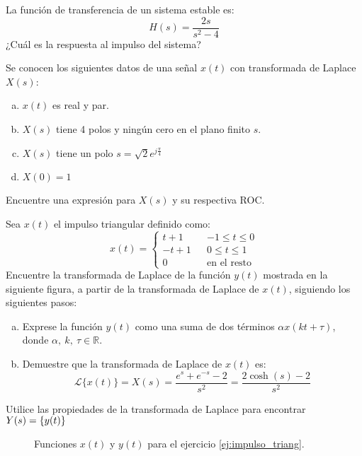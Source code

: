 \begin{ejercicio}
	La función de transferencia de un sistema estable es:
	$$ H(s) = \frac{2s}{s^2-4} $$
	¿Cuál es la respuesta al impulso del sistema?
\end{ejercicio}

\begin{ejercicio}
	Se conocen los siguientes datos de una señal $x(t)$ con transformada de Laplace $X(s)$:
	\begin{enumerate}[a.]
		\item $x(t)$ es real y par.
		\item $X(s)$ tiene 4 polos y ningún cero en el plano finito $s$.
		\item $X(s)$ tiene un polo $s=\sqrt{2}e^{j\frac{\pi}{4}}$
		\item $X(0) = 1$
	\end{enumerate}
	Encuentre una expresión para $X(s)$ y su respectiva ROC.
\end{ejercicio}

\begin{ejercicio}
	\label{ej:impulso_triang}
	Sea $x(t)$ el impulso triangular definido como:
	\begin{equation*}
		x(t) = \left \{
		\begin{matrix}
			t+1 && -1 \leq t \leq 0\\
			-t+1 && 0 \leq t \leq 1\\
			0 && \text{en el resto} 			
		\end{matrix}
		\right .
	\end{equation*}
	Encuentre la transformada de Laplace de la función $y(t)$ mostrada en la siguiente figura, a partir de la transformada de Laplace de $x(t)$, siguiendo los siguientes pasos:


	\begin{enumerate}[a.]
		\item Exprese la función $y(t)$ como una suma de dos términos $\alpha x(kt+\tau)$, donde $\alpha,~k,~\tau \in \mathbb{R}$.
		\item Demuestre que la transformada de Laplace de $x(t)$ es:
			$$ \mathscr{L}\{x(t)\} = X(s) = \dfrac{e^s+e^{-s}-2}{s^2} = \dfrac{2 \cosh(s)-2}{s^2} $$
	\end{enumerate}
		Utilice las propiedades de la transformada de Laplace para encontrar $Y(s) = \mathscr\{y(t)\}$

	\begin{figure}
		\centering
		\subfloat{}
		\subfloat{}
		\caption{Funciones $x(t)$ y $y(t)$ para el ejercicio \ref{ej:impulso_triang}.}
	\end{figure}

\end{ejercicio}


